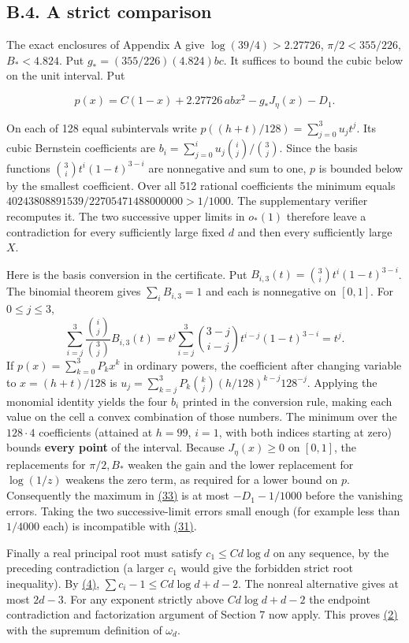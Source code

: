 \documentclass[11pt,a4paper]{article}
\begin{document}
\subsection{B.4. A strict comparison}\label{b.4.-a-strict-comparison}

The exact enclosures of Appendix A give \(\log(39/4)>2.27726\), \(\pi/2<355/226\), \(B_*<4.824\). Put \(g_*=(355/226)(4.824)bc\). It suffices to bound the cubic below on the unit interval. Put

\[
 p(x)=C(1-x)+2.27726\,abx^2-g_*J_\eta(x)-D_1 .                           \tag{34}\label{eq:34}
\]

On each of 128 equal subintervals write \(p((h+t)/128)=\sum_{j=0}^3u_jt^j\). Its cubic Bernstein coefficients are \(b_i=\sum_{j=0}^iu_j\binom ij/\binom3j\). Since the basis functions \(\binom3i t^i(1-t)^{3-i}\) are nonnegative and sum to one, \(p\) is bounded below by the smallest coefficient. Over all 512 rational coefficients the minimum equals \(40243808891539/22705471488000000>1/1000\). The supplementary verifier recomputes it. The two successive upper limits in \(o_*(1)\) therefore leave a contradiction for every sufficiently large fixed \(d\) and then every sufficiently large \(X\).

Here is the basis conversion in the certificate. Put \(B_{i,3}(t)=\binom3i t^i(1-t)^{3-i}\). The binomial theorem gives \(\sum_i B_{i,3}=1\) and each is nonnegative on \([0,1]\). For \(0\le j\le3\), \[
 \sum_{i=j}^3\frac{\binom ij}{\binom3j}B_{i,3}(t)
 =t^j\sum_{i=j}^3\binom{3-j}{i-j}t^{i-j}(1-t)^{3-i}=t^j .
\] If \(p(x)=\sum_{k=0}^3P_kx^k\) in ordinary powers, the coefficient after changing variable to \(x=(h+t)/128\) is \(u_j=\sum_{k=j}^3P_k\binom kj(h/128)^{k-j}128^{-j}\). Applying the monomial identity yields the four \(b_i\) printed in the conversion rule, making each value on the cell a convex combination of those numbers. The minimum over the \(128\cdot4\) coefficients (attained at \(h=99\), \(i=1\), with both indices starting at zero) bounds \textbf{every point} of the interval. Because \(J_\eta(x)\ge0\) on \([0,1]\), the replacements for \(\pi/2,B_*\) weaken the gain and the lower replacement for \(\log(1/z)\) weakens the zero term, as required for a lower bound on \(p\). Consequently the maximum in \hyperref[eq:33]{(33)} is at most \(-D_1-1/1000\) before the vanishing errors. Taking the two successive-limit errors small enough (for example less than \(1/4000\) each) is incompatible with \hyperref[eq:31]{(31)}.

Finally a real principal root must satisfy \(c_1\le C d\log d\) on any sequence, by the preceding contradiction (a larger \(c_1\) would give the forbidden strict root inequality). By \hyperref[eq:4]{(4)}, \(\sum c_i-1\le C d\log d+d-2\). The nonreal alternative gives at most \(2d-3\). For any exponent strictly above \(C d\log d+d-2\) the endpoint contradiction and factorization argument of Section 7 now apply. This proves \hyperref[eq:2]{(2)} with the supremum definition of \(\omega_d\).
\end{document}
